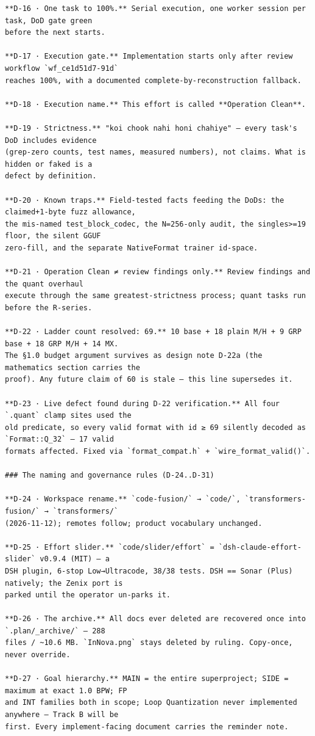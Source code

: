 \begin{Verbatim}[breaklines,breakanywhere,fontsize=\footnotesize]
**D-16 · One task to 100%.** Serial execution, one worker session per task, DoD gate green
before the next starts.

**D-17 · Execution gate.** Implementation starts only after review workflow `wf_ce1d51d7-91d`
reaches 100%, with a documented complete-by-reconstruction fallback.

**D-18 · Execution name.** This effort is called **Operation Clean**.

**D-19 · Strictness.** "koi chook nahi honi chahiye" — every task's DoD includes evidence
(grep-zero counts, test names, measured numbers), not claims. What is hidden or faked is a
defect by definition.

**D-20 · Known traps.** Field-tested facts feeding the DoDs: the claimed+1-byte fuzz allowance,
the mis-named test_block_codec, the N=256-only audit, the singles>=19 floor, the silent GGUF
zero-fill, and the separate NativeFormat trainer id-space.

**D-21 · Operation Clean ≠ review findings only.** Review findings and the quant overhaul
execute through the same greatest-strictness process; quant tasks run before the R-series.

**D-22 · Ladder count resolved: 69.** 10 base + 18 plain M/H + 9 GRP base + 18 GRP M/H + 14 MX.
The §1.0 budget argument survives as design note D-22a (the mathematics section carries the
proof). Any future claim of 60 is stale — this line supersedes it.

**D-23 · Live defect found during D-22 verification.** All four `.quant` clamp sites used the
old predicate, so every valid format with id ≥ 69 silently decoded as `Format::Q_32` — 17 valid
formats affected. Fixed via `format_compat.h` + `wire_format_valid()`.

### The naming and governance rules (D-24..D-31)

**D-24 · Workspace rename.** `code-fusion/` → `code/`, `transformers-fusion/` → `transformers/`
(2026-11-12); remotes follow; product vocabulary unchanged.

**D-25 · Effort slider.** `code/slider/effort` = `dsh-claude-effort-slider` v0.9.4 (MIT) — a
DSH plugin, 6-stop Low→Ultracode, 38/38 tests. DSH == Sonar (Plus) natively; the Zenix port is
parked until the operator un-parks it.

**D-26 · The archive.** All docs ever deleted are recovered once into `.plan/_archive/` — 288
files / ~10.6 MB. `InNova.png` stays deleted by ruling. Copy-once, never override.

**D-27 · Goal hierarchy.** MAIN = the entire superproject; SIDE = maximum at exact 1.0 BPW; FP
and INT families both in scope; Loop Quantization never implemented anywhere — Track B will be
first. Every implement-facing document carries the reminder note.


\end{Verbatim}

